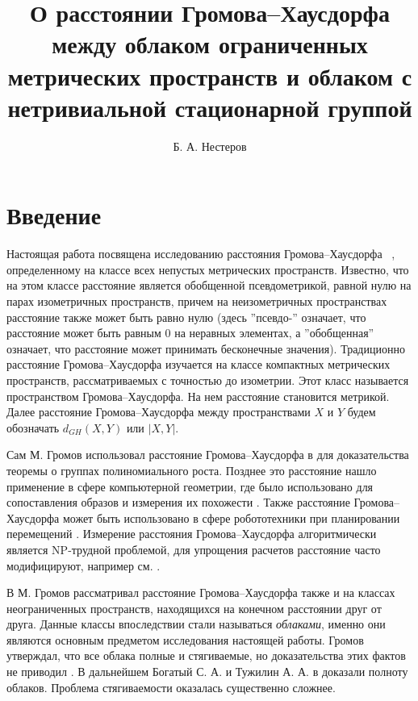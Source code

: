 \documentclass[11pt,twoside,draft
]{article}
\title
{%
О расстоянии Громова--Хаусдорфа между облаком ограниченных метрических пространств и облаком с нетривиальной стационарной группой 
}
{%
On the Gromov--Hausdorff distance between the cloud of bounded
metric spaces and a cloud with nontrivial stabilizer}
\author
{%
Б. А. Нестеров}
{%
B. A. Nesterov}
\begin{document}
\maketitle

\enmaketitle


\section{Введение}  
Настоящая работа посвящена исследованию расстояния Громова--Хаусдорфа ~\cite{Edwards, Gromov81, Gromov99},
определенному на классе всех непустых метрических пространств. Известно, что на этом классе расстояние является обобщенной псевдометрикой, равной нулю на парах изометричных пространств, причем на неизометричных пространствах расстояние также может быть равно нулю (здесь ''псевдо-'' означает, что расстояние может быть равным $0$ на неравных элементах, а ''обобщенная'' означает, что расстояние может принимать бесконечные значения).
Традиционно расстояние Громова--Хаусдорфа изучается на классе компактных метрических пространств, рассматриваемых с точностью до изометрии. Этот класс называется пространством Громова--Хаусдорфа. На нем расстояние становится метрикой. Далее расстояние Громова--Хаусдорфа между пространствами $X$ и $Y$ будем обозначать $d_{GH}(X,Y)$ или $|X,Y|$.



Сам М. Громов использовал расстояние Громова--Хаусдорфа в \cite{Gromov81} для доказательства теоремы о группах полиномиального роста.
Позднее это расстояние нашло применение в сфере компьютерной геометрии, где было использовано для сопоставления образов и измерения их похожести \cite{memoli1}. Также расстояние Громова--Хаусдорфа может быть использовано в сфере робототехники при планировании перемещений 
\cite{robotics}.
Измерение расстояния Громова--Хаусдорфа алгоритмически является NP-трудной проблемой, для  упрощения расчетов расстояние часто модифицируют, например см. \cite{memoli2}.

В \cite{Gromov99}
М. Громов рассматривал расстояние Громова--Хаусдорфа также и на классах неограниченных пространств, находящихся на конечном расстоянии друг от друга. Данные классы впоследствии стали называться \emph{облаками}, именно они являются основным предметом исследования настоящей работы. Громов утверждал, что все облака полные и стягиваемые, но доказательства этих фактов не приводил \cite{Gromov99}. В дальнейшем Богатый С. А. и Тужилин А. А. в \cite{TuzhBog1} доказали полноту облаков. Проблема стягиваемости оказалась существенно сложнее.
\end{document}
